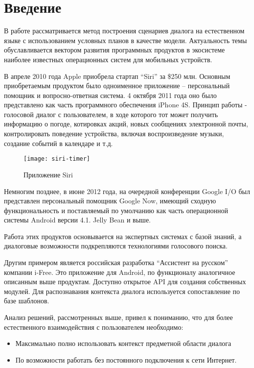 \chapter*{Введение}

В работе рассматривается метод построения сценариев диалога на естественном языке с использованием условных планов в качестве модели. Актуальность темы обуславливается вектором развития программных продуктов в экосистеме наиболее известных операционных систем для мобильных устройств.

В апреле 2010 года Apple приобрела стартап ``Siri'' за \$250 млн. Основным приобретаемым продуктом было одноименное приложение -- персональный помощник и вопросно-ответная система. 4 октября 2011 года оно было представлено как часть программного обеспечения iPhone 4S. Принцип работы - голосовой диалог с пользователем, в ходе которого тот может получить информацию о погоде, котировках акций, новых сообщениях электронной почты, контролировать поведение устройства, включая воспроизведение музыки, создание событий в календаре и т.д.

\begin{wrapfigure}{r}{0.3\textwidth}
 \begin{center}
  \texttt{[image: siri-timer]}
  \caption{Приложение Siri}
 \end{center}
\end{wrapfigure}


Немногим позднее, в июне 2012 года, на очередной конференции Google I/O был представлен персональный помощник Google Now, имеющий сходную функциональность и поставляемый по умолчанию как часть операционной системы Android версии 4.1. Jelly Bean и выше.

Работа этих продуктов основывается на экспертных системах с базой знаний, а диалоговые возможности подкрепляются технологиями голосового поиска.

Другим примером является российская разработка ``Ассистент на русском'' компании i-Free. Это приложение для Android, по функционалу аналогичное описанным выше продуктам. Доступно открытое API для создания собственных модулей. Для распознавания контекста диалога используется сопоставление по базе шаблонов.

Анализ решений, рассмотренных выше, привел к пониманию, что для более естественного взаимодействия с пользователем необходимо:

\begin{itemize}
 \item Максимально полно использовать контекст предметной области диалога
 \item По возможности работать без постоянного подключения к сети Интернет.
\end{itemize}

